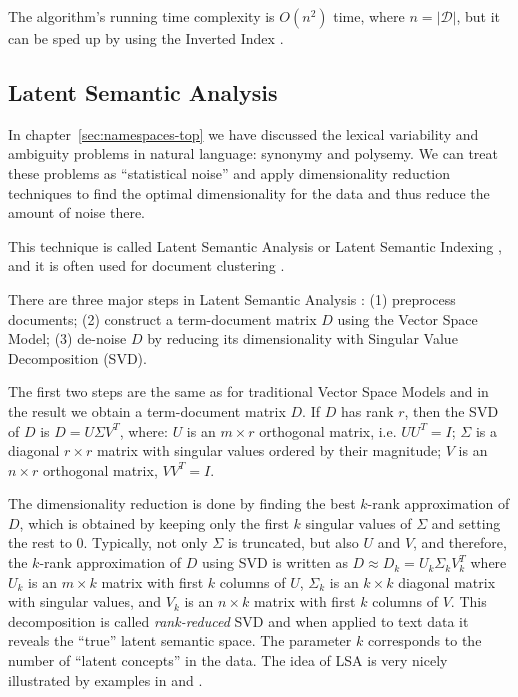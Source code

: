 The algorithm's running time complexity is $O(n^2)$ time, where $n = |\mathcal D|$,
but it can be sped up by using the Inverted Index \cite{ertoz2003finding}.


\subsection{Latent Semantic Analysis} \label{sec:lsa}

In chapter~\ref{sec:namespaces-top} we have discussed the
lexical variability and ambiguity problems in natural language: synonymy
and polysemy. We can treat these problems as ``statistical noise'' and
apply dimensionality reduction techniques to find the optimal dimensionality
for the data and thus reduce the amount of noise there.

This technique is called Latent Semantic Analysis \cite{landauer1998introduction}
or Latent Semantic Indexing \cite{deerwester1990indexing}, and 
it is often used for document clustering \cite{aggarwal2012survey} \cite{osinski2004lingo}.

There are three major steps in Latent Semantic Analysis  \cite{evangelopoulos2012latent}:
(1) preprocess documents;
(2) construct a term-document matrix $D$ using the Vector Space Model;
(3) de-noise $D$ by reducing its dimensionality with Singular Value Decomposition (SVD).

The first two steps are the same as for traditional Vector Space Models 
and in the result we obtain a term-document matrix $D$. 
If $D$ has rank $r$, then the SVD of $D$ is $D = U  \Sigma V^T$, where:
$U$ is an $m \times r$ orthogonal matrix, i.e. $U U^T = I$;
$\Sigma$ is a diagonal $r \times r$ matrix with singular values ordered by their magnitude;
$V$ is an $n \times r$ orthogonal matrix, $V V^T = I$.

The dimensionality reduction is done by finding the best $k$-rank approximation
of $D$, which is obtained by keeping only the first $k$ singular values of $\Sigma$
and setting the rest to 0.
Typically, not only $\Sigma$ is truncated, but also $U$ and $V$,
and therefore, the $k$-rank approximation of $D$ using SVD is written as
$D \approx D_k = U_k \Sigma_k V_k^T$ where $U_k$ is an $m \times k$
matrix with first $k$ columns of $U$, $\Sigma_k$ is an $k \times k$
diagonal matrix with singular values, and $V_k$ is an $n \times k$
matrix with first $k$ columns of $V$.  This decomposition
is called \emph{rank-reduced} SVD and when applied to text data
it reveals the ``true'' latent semantic space. The parameter $k$ corresponds
to the number of ``latent concepts'' in the data. The idea
of LSA is very nicely illustrated by examples  in
\cite{deerwester1990indexing} and \cite{landauer1998introduction}.

